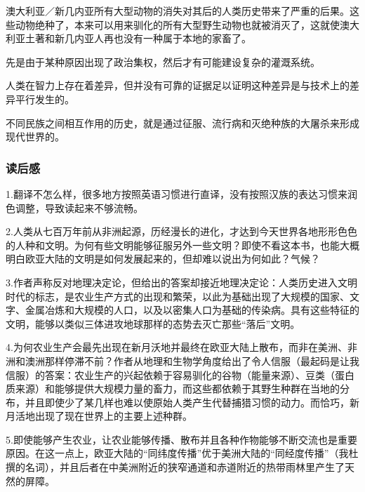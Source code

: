 澳大利亚／新几内亚所有大型动物的消失对其后的人类历史带来了严重的后果。这些动物绝种了，本来可以用来驯化的所有大型野生动物也就被消灭了，这就使澳大利亚土著和新几内亚人再也没有一种属于本地的家畜了。

先是由于某种原因出现了政治集权，然后才有可能建设复杂的灌溉系统。

人类在智力上存在着差异，但并没有可靠的证据足以证明这种差异是与技术上的差异平行发生的。

不同民族之间相互作用的历史，就是通过征服、流行病和灭绝种族的大屠杀来形成现代世界的。

\subsubsection{读后感}
1.翻译不怎么样，很多地方按照英语习惯进行直译，没有按照汉族的表达习惯来润色调整，导致读起来不够流畅。

2.人类从七百万年前从非洲起源，历经漫长的进化，才达到今天世界各地形形色色的人种和文明。为何有些文明能够征服另外一些文明？即使不看这本书，也能大概明白欧亚大陆的文明是如何发展起来的，但却难以说出为何如此？气候？

3.作者声称反对地理决定论，但给出的答案却接近地理决定论：人类历史进入文明时代的标志，是农业生产方式的出现和繁荣，以此为基础出现了大规模的国家、文字、金属冶炼和大规模的人口，以及以密集人口为基础的传染病。具有这些特征的文明，能够以类似三体进攻地球那样的态势去灭亡那些“落后”文明。

4.为何农业生产会最先出现在新月沃地并最终在欧亚大陆上散布，而非在美洲、非洲和澳洲那样停滞不前？作者从地理和生物学角度给出了令人信服（最起码是让我信服）的答案：农业生产的兴起依赖于容易驯化的谷物（能量来源）、豆类（蛋白质来源）和能够提供大规模力量的畜力，而这些都依赖于其野生种群在当地的分布，并且即使少了某几样也难以使原始人类产生代替捕猎习惯的动力。而恰巧，新月活地出现了现在世界上的主要上述种群。

5.即使能够产生农业，让农业能够传播、散布并且各种作物能够不断交流也是重要原因。在这一点上，欧亚大陆的“同纬度传播”优于美洲大陆的“同经度传播”（我杜撰的名词），并且后者在中美洲附近的狭窄通道和赤道附近的热带雨林里产生了天然的屏障。